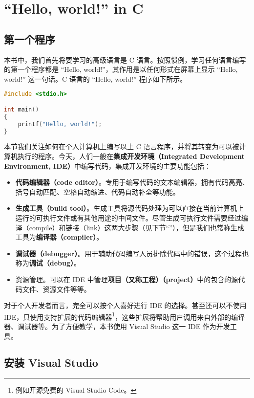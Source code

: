 
\section{“Hello, world!” in C}

\subsection{第一个程序}

本书中，我们首先将要学习的高级语言是 C 语言。按照惯例，学习任何语言编写的第一个程序都是 “Hello, world!”，其作用是以任何形式在屏幕上显示 “Hello, world!” 这一句话。C 语言的 “Hello, world!” 程序如下所示。

\begin{lstlisting}[language=c]
#include <stdio.h>

int main()
{
	printf("Hello, world!");
}
\end{lstlisting}

本节我们关注如何在个人计算机上编写以上 C 语言程序，并将其转变为可以被计算机执行的程序。今天，人们一般在\textbf{集成开发环境（Integrated Development Environment, IDE）}中编写代码，集成开发环境的主要功能包括：
\begin{itemize}
	\item \textbf{代码编辑器（code editor）}。专用于编写代码的文本编辑器，拥有代码高亮、括号自动匹配、空格自动缩进、代码自动补全等功能。
	\item \textbf{生成工具（build tool）}。生成工具将源代码处理为可以直接在当前计算机上运行的可执行文件或有其他用途的中间文件。尽管生成可执行文件需要经过编译（compile）和链接（link）这两大步骤（见下节“”），但是我们也常称生成工具为\textbf{编译器（compiler）}。
	\item \textbf{调试器（debugger）}。用于辅助代码编写人员排除代码中的错误，这个过程也称为\textbf{调试（debug）}。
	\item 资源管理。可以在 IDE 中管理\textbf{项目（又称工程）（project）}中的包含的源代码文件、资源文件等等。
\end{itemize}

对于个人开发者而言，完全可以按个人喜好进行 IDE 的选择。甚至还可以不使用 IDE，只使用支持扩展的代码编辑器\footnote{例如开源免费的 Visual Studio Code。}，这些扩展将帮助用户调用来自外部的编译器、调试器等。为了方便教学，本书使用 Visual Studio 这一 IDE 作为开发工具。

\subsection{安装 Visual Studio}



\pagebreak